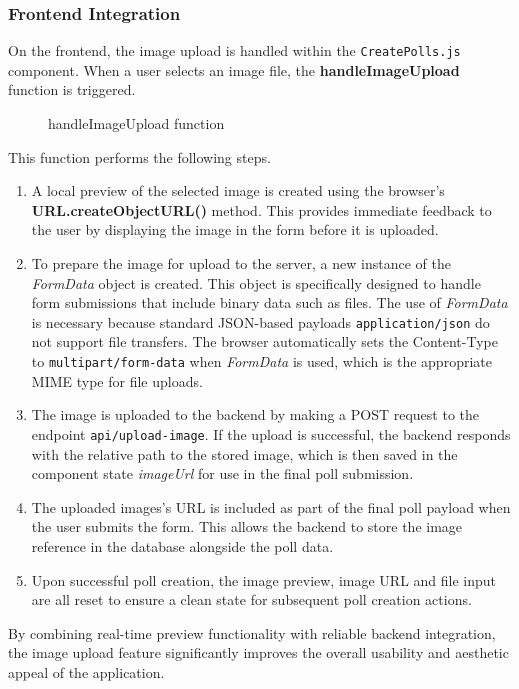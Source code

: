 \documentclass[a4paper,12pt]{report}
\begin{document}
\subsubsection{Frontend Integration}
On the frontend, the image upload is handled within the \texttt{CreatePolls.js} component. When a user selects an image file, the \textbf{handleImageUpload} function is triggered. 
\begin{figure}[H]
	\caption{handleImageUpload function}
	\label{fig:handleImageUpload}
\end{figure}
\noindent
This function performs the following steps.
\begin{enumerate}
	\item A local preview of the selected image is created using the browser's \textbf{URL.createObjectURL()} method. This provides immediate feedback to the user by displaying the image in the form before it is uploaded.
	\item To prepare the image for upload to the server, a new instance of the \textit{FormData} object is created. This object is specifically designed to handle form submissions that include binary data such as files. The use of \textit{FormData} is necessary because standard JSON-based payloads \texttt{application/json} do not support file transfers. The browser automatically sets the Content-Type to \texttt{multipart/form-data} when \textit{FormData} is used, which is the appropriate MIME type for file uploads.
	\item The image is uploaded to the backend by making a POST request to the endpoint \texttt{api/upload-image}. If the upload is successful, the backend responds with the relative path to the stored image, which is then saved in the component state \textit{imageUrl} for use in the final poll submission.
	\item The uploaded images's URL is included as part of the final poll payload when the user submits the form. This allows the backend to store the image reference in the database alongside the poll data.
	\item Upon successful poll creation, the image preview, image URL and file input are all reset to ensure a clean state for subsequent poll creation actions.
\end{enumerate}
By combining real-time preview functionality with reliable backend integration, the image upload feature significantly improves the overall usability and aesthetic appeal of the application. \\
\end{document}
